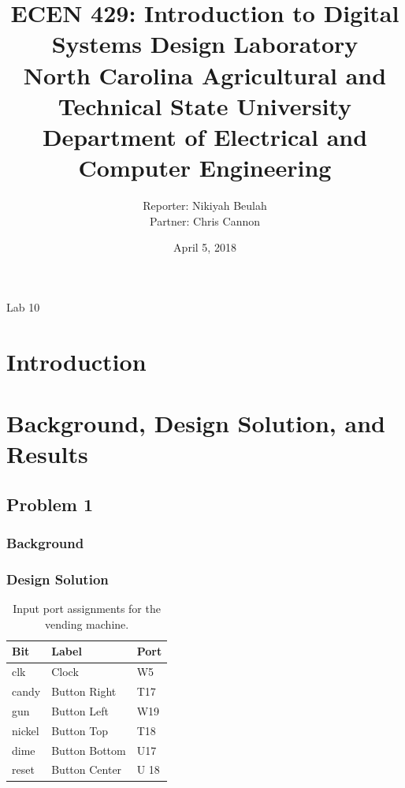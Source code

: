 \documentclass[11pt]{article}
\title {{\titleFont ECEN 429: Introduction to Digital Systems Design Laboratory \\ North Carolina Agricultural and Technical State University \\ Department of Electrical and Computer Engineering}} %
\author{\titleFont Reporter: Nikiyah Beulah \\ \titleFont Partner: Chris Cannon} %
\date{\titleFont April 5, 2018}
\begin{document}
\begin{titlingpage}
\maketitle
\begin{center}
	Lab 10
\end{center}
\end{titlingpage}

\section{Introduction}

\section{Background, Design Solution, and Results}

\subsection{Problem 1 }

\subsubsection{Background}

\subsubsection{Design Solution}

\begin{table}[H]
\begin{center}
\begin{tabular}{| l | l | l |}
	\hline
	Bit & Label & Port \\ \hline
	clk & Clock & W5 \\ \hline
	candy & Button Right & T17 \\ \hline
	gun & Button Left & W19 \\ \hline
	nickel & Button Top & T18 \\ \hline
	dime & Button Bottom & U17 \\ \hline
	reset & Button Center & U 18 \\ \hline
\end{tabular}
\caption{\label{tab:lab10_input_Ports}Input port assignments for  the vending machine.}
\end{center}
\end{table}
\end{document}

